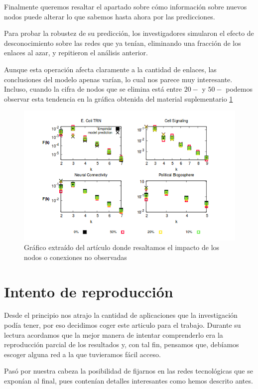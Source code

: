\documentclass[1p]{elsarticle}
\begin{document}
Finalmente queremos resaltar el apartado sobre cómo información sobre nuevos nodos puede alterar lo que sabemos hasta ahora por las predicciones.

 Para probar la robustez
de su predicción, los investigadores simularon el efecto de desconocimiento sobre las redes que ya tenían,
eliminando una fracción de los enlaces al azar, y repitieron el análisis anterior. 

Aunque esta operación afecta claramente a la cantidad de enlaces, las conclusiones del modelo apenas varían, lo cual nos parece muy interesante. Incluso, cuando la cifra de nodos que se elimina está entre $20-$ y $50-$ podemos observar esta tendencia en la gráfica obtenida del material suplementario \ref{h4}
\begin{figure}
	\centering
	\includegraphics[width=15cm]{graf_3.png}
	\caption{Gráfico extraído del artículo donde resaltamos el impacto de los nodos o conexiones no observadas}
	\label{h4}
\end{figure}

\section{Intento de reproducción}
Desde el principio nos atrajo la cantidad de aplicaciones que la investigación podía tener, por eso decidimos coger este articulo para el trabajo. Durante su lectura acordamos que la mejor manera de intentar comprenderlo era la reproducción parcial de los resultados y, con tal fin, pensamos que, debíamos escoger alguna red a la que tuvieramos fácil acceso.

Pasó por nuestra cabeza la posibilidad de fijarnos en las redes tecnológicas que se exponían al final, pues contenían detalles interesantes como hemos descrito antes.
\end{document}
